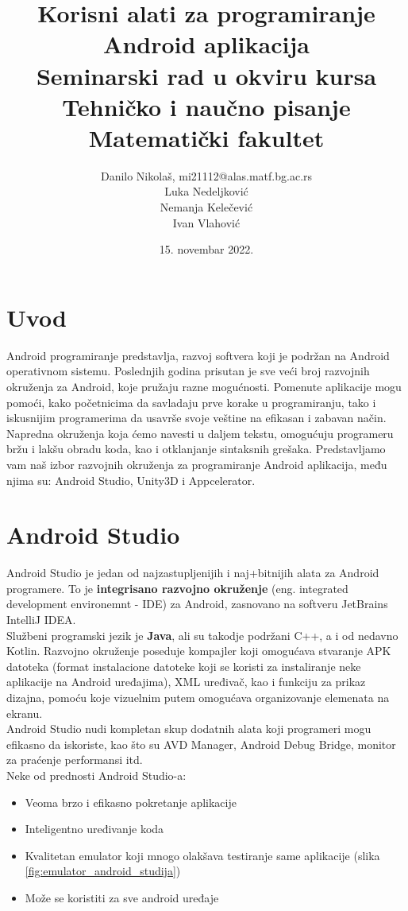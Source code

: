 \documentclass[12pt]{article}
\title{Korisni alati za programiranje Android aplikacija\\ \small{Seminarski rad u okviru kursa\\Tehničko i naučno pisanje\\ Matematički fakultet}}
\author{Danilo Nikolaš, mi21112@alas.matf.bg.ac.rs \\ Luka Nedeljković \\ Nemanja Kelečević \\ Ivan Vlahović}
\date{15. novembar 2022.}
\begin{document}
\maketitle
{}
\tableofcontents
\pagebreak

\section{Uvod}
Android programiranje predstavlja, razvoj softvera koji je podržan na Android operativnom sistemu.
Poslednjih godina prisutan je sve veći broj razvojnih okruženja za Android, koje pružaju razne mogućnosti. Pomenute aplikacije mogu pomoći, 
kako početnicima da savladaju prve korake u programiranju, tako i iskusnijim programerima da usavrše svoje veštine na efikasan i zabavan način.
Napredna okruženja koja ćemo navesti u daljem tekstu, omogućuju programeru bržu i lakšu obradu koda, kao i otklanjanje sintaksnih grešaka. 
Predstavljamo vam naš izbor razvojnih okruženja za programiranje Android aplikacija, među njima su: Android Studio, Unity3D i Appcelerator. \

\section{Android Studio}
Android Studio je jedan od najzastupljenijih i naj+bitnijih alata za Android programere. To je \textbf{integrisano razvojno okruženje} (eng. integrated development environemnt - IDE) za Android, zasnovano na softveru JetBrains IntelliJ IDEA.  \\
\hspace*{0.7cm}Službeni programski jezik je \textbf{Java}, ali su takodje podržani C++, a i od nedavno Kotlin. Razvojno okruženje poseduje kompajler koji omogućava stvaranje APK datoteka (format instalacione datoteke koji se koristi za instaliranje neke aplikacije na Android uređajima), XML uređivač, kao i funkciju za prikaz dizajna, pomoću koje vizuelnim putem omogućava organizovanje elemenata na ekranu.\cite{Android Studio} \\
\hspace*{0.7cm}Android Studio nudi kompletan skup dodatnih alata koji programeri mogu efikasno da iskoriste, kao što su AVD Manager, Android Debug Bridge, monitor za praćenje performansi itd.\\
\hspace*{0.7cm}Neke od prednosti Android Studio-a:
\begin{itemize}
\item{Veoma brzo i efikasno pokretanje aplikacije}
\item{Inteligentno uređivanje koda} 
\item{Kvalitetan emulator koji mnogo olakšava testiranje same aplikacije (slika \ref{fig:emulator_android_studija})}
\item{Može se koristiti za sve android uređaje}
\end{itemize}
\end{document}
